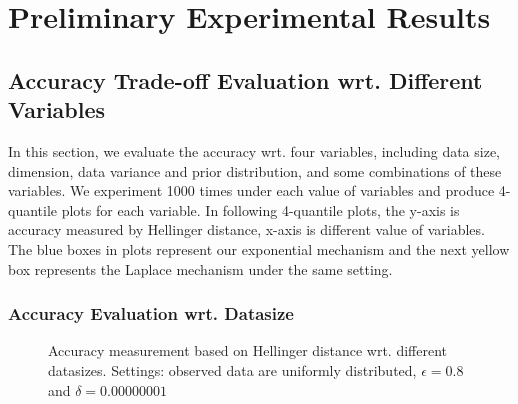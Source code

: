 \documentclass[sigconf, anonymous]{acmart}
\begin{document}

\section{Preliminary Experimental Results}
\label{sec_experiment}


\subsection{Accuracy Trade-off Evaluation wrt. Different Variables}
\label{subsec_vs_variables}

In this section, we evaluate the accuracy wrt. four variables, including data size, dimension, data variance and prior distribution, and some combinations of these variables. We experiment 1000 times under each value of variables and produce 4-quantile plots for each variable. In following 4-quantile plots, the y-axis is accuracy measured by Hellinger distance, x-axis is different value of variables. The blue boxes in plots represent our exponential mechanism and the next yellow box represents the Laplace mechanism under the same setting.

\subsubsection{Accuracy Evaluation wrt. Datasize}
\label{subsubsec_vs_datasize}

\begin{figure}[ht]
\begin{center}
\centering
\caption{Accuracy measurement based on Hellinger distance wrt. different datasizes. Settings: observed data are uniformly distributed, $\epsilon = 0.8$ and $\delta = 0.00000001$}
\label{fig_vs_datasize}
\end{center}
\end{figure}
\end{document}

